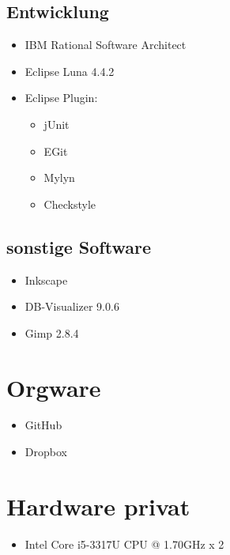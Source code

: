 \documentclass[a4paper]{scrreprt}
\begin{document}
        \subsection{Entwicklung}
           \begin{itemize}
           	\item IBM Rational Software Architect
           	\item Eclipse Luna 4.4.2
           	\item Eclipse Plugin: \\
	           	\begin{itemize}
	           		\item jUnit
	           		\item EGit
	           		\item Mylyn
	           		\item Checkstyle  
	           	\end{itemize} 
           \end{itemize}
           
        \subsection{sonstige Software}
            \begin{itemize}
            	\item Inkscape
            	\item DB-Visualizer 9.0.6
            	\item Gimp 2.8.4
            \end{itemize}
           
    \section{Orgware}
        \begin{itemize}
        	\item GitHub
        	\item Dropbox
        \end{itemize}
        
    \section{Hardware privat}
        \begin{itemize}
        	\item Intel Core i5-3317U CPU @ 1.70GHz x 2
        \end{itemize}
            
        
\printnoidxglossaries
\end{document}
